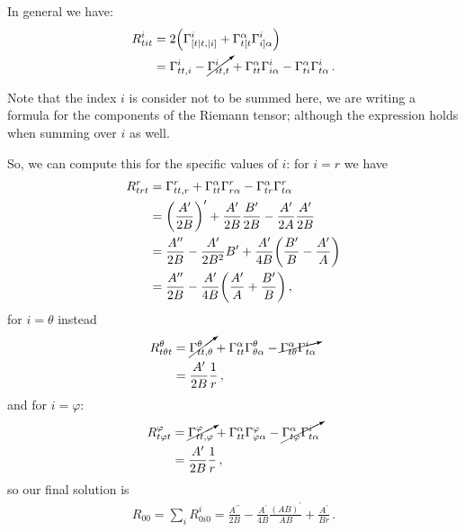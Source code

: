 \documentclass[main.tex]{subfiles}
\begin{document}
In general we have: 
%
\begin{subequations}
\begin{align}
  R^{i}_{tit} &= 2 \qty( \Gamma^{i}_{[t| t, |i]}  + \Gamma^{\alpha }_{t[t} \Gamma^{i}_{i] \alpha })  \\
  &= \Gamma^{i}_{tt, i} - \cancelto{}{\Gamma^{i}_{it,t}}
  + \Gamma^{\alpha }_{tt} \Gamma^{i}_{i\alpha }
  - \Gamma^{\alpha }_{ti} \Gamma^{i}_{t\alpha }
\,.
\end{align}
\end{subequations}

Note that the index \(i\) is consider not to be summed here, we are writing a formula for the components of the Riemann tensor; although the expression holds when summing over \(i\) as well. 

So, we can compute this for the specific values of \(i\): for \(i=r\) we have 
%
\begin{subequations}
\begin{align}
  R^{r}_{trt} &= \Gamma^{r}_{tt, r} + \Gamma^{\alpha}_{tt} 
  \Gamma^{r}_{r \alpha } - \Gamma^{\alpha }_{tr} \Gamma^{r}_{t \alpha }  \\
  &= \qty(\frac{A^{\prime }}{2B})^{\prime } + \frac{A^{\prime }}{2B} \frac{B^{\prime }}{2B} - \frac{A^{\prime }}{2A} \frac{A^{\prime }}{2B}  \\
  &= \frac{A^{\prime \prime}}{2B} - \frac{A^{\prime }}{2B^2} B^{\prime } + \frac{A^{\prime }}{4B} \qty(\frac{B^{\prime }}{B} - \frac{A^{\prime}}{A}) \\ 
  &= \frac{A^{\prime \prime}}{2B} - \frac{A^{\prime }}{4B} \qty(\frac{A^{\prime}}{A} + \frac{B^{\prime }}{B})
  \,,
\end{align}
\end{subequations}
%
for \(i= \theta \) instead 
%
\begin{subequations}
\begin{align}
  R^{\theta }_{t \theta  t} &= \cancelto{}{\Gamma^{\theta}_{tt, \theta}} + \Gamma^{\alpha}_{tt} 
  \Gamma^{\theta}_{\theta \alpha } - \cancelto{}{\Gamma^{\alpha }_{t\theta} \Gamma^{i}_{t \alpha }}  \\
  &= \frac{A^{\prime }}{2B} \frac{1}{r}
  \,,
\end{align}
\end{subequations}
%
and for \(i = \varphi \):  
%
\begin{subequations}
  \begin{align}
    R^{\varphi }_{t \varphi t} &= \cancelto{}{\Gamma^{\varphi}_{tt, \varphi}} + \Gamma^{\alpha}_{tt} 
    \Gamma^{\varphi}_{\varphi \alpha } - \cancelto{}{\Gamma^{\alpha }_{t\varphi} \Gamma^{i}_{t \alpha }}  \\
    &= \frac{A^{\prime }}{2B} \frac{1}{r}
    \,,
  \end{align}
\end{subequations}
%
so our final solution is 
%
\begin{align}
  R_{00} = \sum_i R^{i}_{0i0} = \frac{A^{\prime \prime}}{2B} 
  - \frac{A^{\prime }}{4B} \frac{(AB)^{\prime }}{AB} + \frac{A^{\prime }}{Br}
\,.
\end{align}
%
\end{document}
